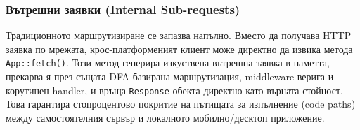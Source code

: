 \subsubsection{Вътрешни заявки (Internal Sub-requests)}
Традиционното маршрутизиране се запазва напълно. Вместо да получава HTTP заявка по мрежата, крос-платформеният клиент може директно да извика метода \texttt{App::fetch()}. Този метод генерира изкуствена вътрешна заявка в паметта, прекарва я през същата DFA-базирана маршрутизация, middleware верига и корутинен handler, и връща \texttt{Response} обекта директно като върната стойност. Това гарантира стопроцентово покритие на пътищата за изпълнение (code paths) между самостоятелния сървър и локалното мобилно/десктоп приложение.
